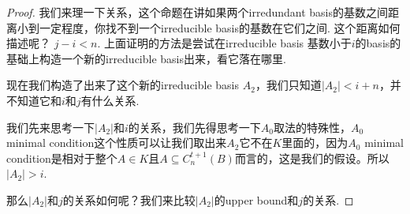 \documentclass{article}
\begin{document}
\begin{proof}
我们来理一下关系，这个命题在讲如果两个irredundant basis的基数之间距离小到一定程度，你找不到一个irreducible basis的基数在它们之间. 这个距离如何描述呢？ $j-i < n$. 上面证明的方法是尝试在irreducible basis 基数小于$i$的basis的基础上构造一个新的irreducible basis出来，看它落在哪里. 

现在我们构造了出来了这个新的irreducible basis $A_2$，我们只知道$|A_2| < i + n$，并不知道它和$i$和$j$有什么关系. 

我们先来思考一下$|A_2|$和$i$的关系，我们先得思考一下$A_0$取法的特殊性，$A_0$ minimal condition这个性质可以让我们取出来$A_2$它不在$K$里面的，因为$A_0$ minimal condition是相对于整个$A \in K$且$A \subseteq C_n^{t+1}(B)$而言的，这是我们的假设。所以$|A_2| > i$.

那么$|A_2|$和$j$的关系如何呢？我们来比较$|A_2|$的upper bound和$j$的关系.
\end{proof}
\end{document}

